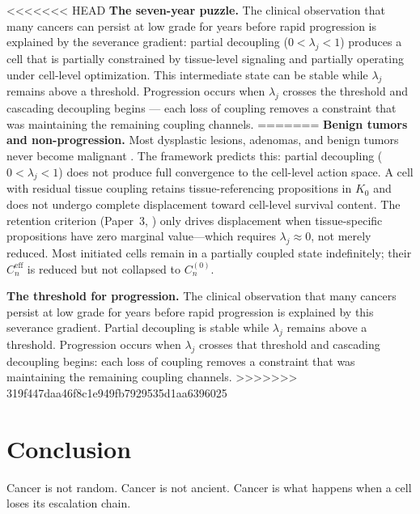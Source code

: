 \documentclass[11pt]{article}
\theoremstyle{definition}
\theoremstyle{remark}
\begin{document}
<<<<<<< HEAD
\textbf{The seven-year puzzle.} The clinical observation that many
cancers can persist at low grade for years before rapid progression
is explained by the severance gradient: partial decoupling
($0 < \lambda_j < 1$) produces a cell that is partially constrained
by tissue-level signaling and partially operating under cell-level
optimization. This intermediate state can be stable while $\lambda_j$
remains above a threshold. Progression occurs when $\lambda_j$
crosses the threshold and cascading decoupling begins --- each loss
of coupling removes a constraint that was maintaining the remaining
coupling channels.
=======
\textbf{Benign tumors and non-progression.} Most dysplastic lesions,
adenomas, and benign tumors never become malignant \cite{Nowell1976}.
The framework predicts this: partial decoupling ($0 < \lambda_j < 1$)
does not produce full convergence to the cell-level action space.
A cell with residual tissue coupling retains tissue-referencing
propositions in $K_0$ and does not undergo complete displacement
toward cell-level survival content. The retention criterion
(Paper~3, \cite{McCarthy2026c}) only drives displacement when
tissue-specific propositions have zero marginal value---which
requires $\lambda_j \approx 0$, not merely reduced. Most initiated
cells remain in a partially coupled state indefinitely; their
$C_n^{\mathrm{eff}}$ is reduced but not collapsed to $C_n^{(0)}$.

\textbf{The threshold for progression.} The clinical observation
\cite{Folkman1971} that many cancers persist at low grade for years
before rapid progression is explained by this severance gradient.
Partial decoupling is stable while $\lambda_j$ remains above a
threshold. Progression occurs when $\lambda_j$ crosses that threshold
and cascading decoupling begins: each loss of coupling removes a
constraint that was maintaining the remaining coupling channels.
>>>>>>> 319f447daa46f8c1e949fb7929535d1aa6396025

\section{Conclusion}
\label{sec:conclusion}

Cancer is not random. Cancer is not ancient. Cancer is what happens
when a cell loses its escalation chain.
\end{document}
